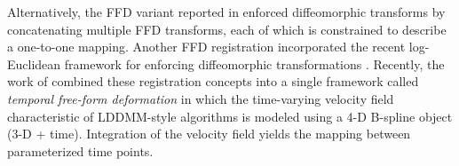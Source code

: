 \documentclass{frontiersSCNS}
\begin{document}


Alternatively, the FFD 
variant reported in \cite{rueckert2006} enforced diffeomorphic transforms
by concatenating multiple FFD transforms, each of which is constrained
to describe a one-to-one mapping.  Another FFD registration
incorporated the recent log-Euclidean framework for enforcing diffeomorphic
transformations \cite{Modat2011}.
Recently, the work of 
\cite{de-craene2011} combined these registration concepts into a single
framework called {\em temporal free-form deformation} in which the 
time-varying velocity field characteristic of LDDMM-style algorithms
is modeled using a 4-D B-spline object (3-D + time).  Integration of 
the velocity field yields the mapping between parameterized time points.






%
%
%
%
%
%
%
\end{document}
